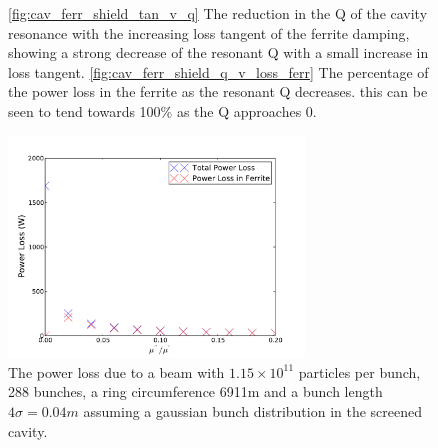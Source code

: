 \begin{figure}
\label{fig:screen_res_alterations}
\caption{\ref{fig:cav_ferr_shield_tan_v_q} The reduction in the Q of the cavity resonance with the increasing loss tangent of the ferrite damping, showing a strong decrease of the resonant Q with a small increase in loss tangent. \ref{fig:cav_ferr_shield_q_v_loss_ferr} The percentage of the power loss in the ferrite as the resonant Q decreases. this can be seen to tend towards 100\% as the Q approaches 0.}
\end{figure}

\begin{figure}
\begin{center}
\includegraphics[width=0.7\textwidth]{Beam_Coupling_Impedance_Reduction_Techniques/figures/screen_loss_tan_vs_power.pdf}
\end{center}
\label{fig:screen_loss_tan_v_power}
\caption{The power loss due to a beam with $1.15 \times 10^{11}$ particles per bunch, 288 bunches, a ring circumference 6911m and a bunch length $4\sigma = 0.04m$ assuming a gaussian bunch distribution in the screened cavity.}
\end{figure}

